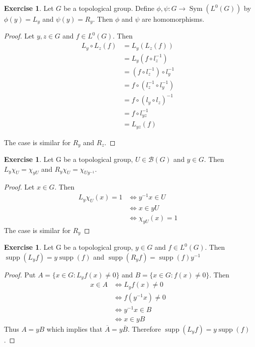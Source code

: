 \documentclass[12pt]{amsart}
\theoremstyle{definition}
\newtheorem{ex}[definition]{Exercise}
\newcommand{\MB}{\mathcal{B}}
\DeclareMathOperator{\supp}{supp}
\DeclareMathOperator{\Sym}{Sym}
\newcommand{\lex}[1]{\label{ex:#1}}
\begin{document}
	\begin{ex} \lex{00000} 
	Let $G$ be a topological group. Define $\phi, \psi: G \rightarrow \Sym(L^0(G))$ by $\phi(y) = L_y$ and $\psi(y) = R_y$. Then $\phi$ and $\psi$ are homomorphisms.
	\end{ex}

	\begin{proof}
		Let $y,z \in G$ and $f \in L^0(G)$. Then 
		\begin{align*}
			L_y \circ L_z(f)
			& = L_y (L_z (f))  \\
			& = L_y (f \circ l_z^{-1})  \\
			& = (f \circ l_z^{-1}) \circ l_y^{-1} \\
			&= f \circ (l_z^{-1} \circ l_y^{-1}) \\
			& = f \circ (l_y \circ l_z)^{-1}  \\
			& = f \circ l_{yz}^{-1} \\
			&= L_{yz} (f)
		\end{align*}
		
		The case is similar for $R_y$ and $ R_z$.
	\end{proof}
	
	\begin{ex} \lex{00000} 
		Let G be a topological group, $U \in \MB(G)$ and $y \in G$. Then $L_y\chi_U = \chi_{yU}$ and $R_y\chi_U = \chi_{Uy^{-1}}$. 
	\end{ex}
	
	\begin{proof}
		Let $x \in G$. Then 
		\begin{align*}
			L_y\chi_U(x) = 1
			& \iff y^{-1}x \in U\\
			& \iff x \in yU \\
			& \iff \chi_{yU}(x) = 1
		\end{align*}
		The case is similar for $R_y$
	\end{proof}
	
	\begin{ex} \lex{00000} 
		Let G be a topological group, $y \in G$ and $f \in L^0(G)$. Then $\supp(L_yf) = y\supp(f)$ and $\supp(R_yf) = \supp(f)y^{-1}$
	\end{ex}
	
	\begin{proof}
		Put $A = \{x \in G: L_yf(x) \neq 0 \}$ and $B = \{x \in G: f(x) \neq 0 \}$. Then 
		\begin{align*}
			x \in A
			& \iff L_yf(x) \neq 0 \\
			& \iff f(y^{-1}x) \neq 0 \\
			& \iff y^{-1}x \in B \\
			& \iff x \in yB
		\end{align*}
		Thus $A = yB$ which implies that $\overline{A} = y\overline{B}$. Therefore $\supp(L_yf) = y\supp(f)$.
	\end{proof}
	
\end{document}
